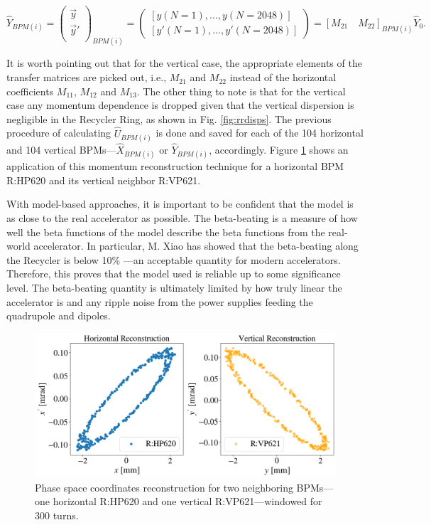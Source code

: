 \begin{equation}
    \label{eq:ybpmi}
    \hat{Y}_{BPM(i)} = \begin{pmatrix}
        \vec{y} \\
        \vec{y}' \\
    \end{pmatrix}_{BPM(i)}=
    \begin{pmatrix}
        \left[ y(N=1),...,y(N=2048) \right] \\
        \left[ y'(N=1),..., y'(N=2048) \right] 
    \end{pmatrix}
    = \left[ M_{21} \quad M_{22} \right]_{BPM(i)} \hat{Y}_0.  
\end{equation}

It is worth pointing out that for the vertical case, the appropriate elements of the transfer matrices are picked out, i.e., $M_{21}$ and $M_{22}$ instead of the horizontal coefficients $M_{11}$, $M_{12}$ and $M_{13}$. The other thing to note is that for the vertical case any momentum dependence is dropped given that the vertical dispersion is negligible in the Recycler Ring, as shown in Fig. \ref{fig:rrdisps}. The previous procedure of calculating $\hat{U}_{BPM(i)}$ is done and saved for each of the 104 horizontal and 104 vertical BPMs---$\hat{X}_{BPM(i)}$ or $\hat{Y}_{BPM(i)}$, accordingly. Figure \ref{fig:momentum} shows an application of this momentum reconstruction technique for a horizontal BPM R:HP620 and its vertical neighbor R:VP621. 

With model-based approaches, it is important to be confident that the model is as close to the real accelerator as possible. The beta-beating is a measure of how well the beta functions of the model describe the beta functions from the real-world accelerator. In particular, M. Xiao has showed that the beta-beating along the Recycler is below 10\% \cite{rr3}---an acceptable quantity for modern accelerators. Therefore, this proves that the model used is reliable up to some significance level. The beta-beating quantity is ultimately limited by how truly linear the accelerator is and any ripple noise from the power supplies feeding the quadrupole and dipoles.

\begin{figure}[H]
    \centering
    \includegraphics[width=\columnwidth]{chapter4/momentum.png}
    \caption{Phase space coordinates reconstruction for two neighboring BPMs---one horizontal R:HP620 and one vertical R:VP621---windowed for 300 turns.}
    \label{fig:momentum}
\end{figure}


